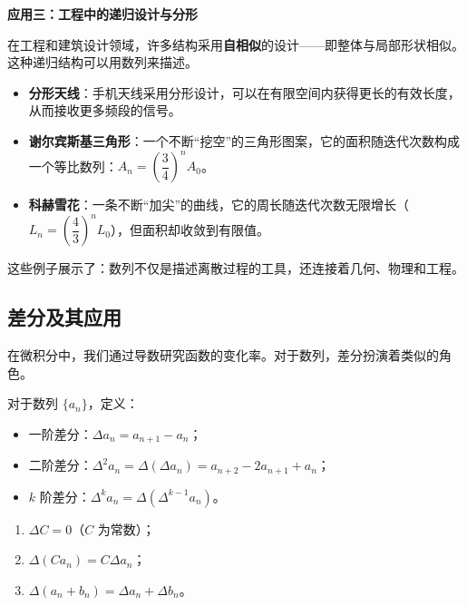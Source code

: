 \documentclass{ctexart}
\newenvironment{custom}[1]{\par\noindent \textbf{#1}\quad}{\par\vspace{1em}}
\begin{document}
\begin{custom}{应用三：工程中的递归设计与分形}

在工程和建筑设计领域，许多结构采用\textbf{自相似}的设计——即整体与局部形状相似。这种递归结构可以用数列来描述。

\begin{itemize}
\item \textbf{分形天线}：手机天线采用分形设计，可以在有限空间内获得更长的有效长度，从而接收更多频段的信号。
\item \textbf{谢尔宾斯基三角形}：一个不断“挖空”的三角形图案，它的面积随迭代次数构成一个等比数列：\(A_n = \left(\dfrac{3}{4}\right)^n A_0\)。
\item \textbf{科赫雪花}：一条不断“加尖”的曲线，它的周长随迭代次数无限增长（\(L_n = \left(\dfrac{4}{3}\right)^n L_0\)），但面积却收敛到有限值。
\end{itemize}

这些例子展示了：数列不仅是描述离散过程的工具，还连接着几何、物理和工程。
\end{custom}

\subsection{差分及其应用}

在微积分中，我们通过导数研究函数的变化率。对于数列，差分扮演着类似的角色。

\begin{definition}[差分]
对于数列 \(\{a_n\}\)，定义：
\begin{itemize}
\item 一阶差分：\(\Delta a_n = a_{n+1} - a_n\)；
\item 二阶差分：\(\Delta^2 a_n = \Delta(\Delta a_n) = a_{n+2} - 2a_{n+1} + a_n\)；
\item \(k\) 阶差分：\(\Delta^k a_n = \Delta(\Delta^{k-1} a_n)\)。
\end{itemize}
\end{definition}

\begin{proposition}[差分的性质]
\begin{enumerate}
\item \(\Delta C = 0\)（\(C\) 为常数）；
\item \(\Delta(C a_n) = C \Delta a_n\)；
\item \(\Delta(a_n + b_n) = \Delta a_n + \Delta b_n\)。
\end{enumerate}
\end{proposition}
\end{document}
